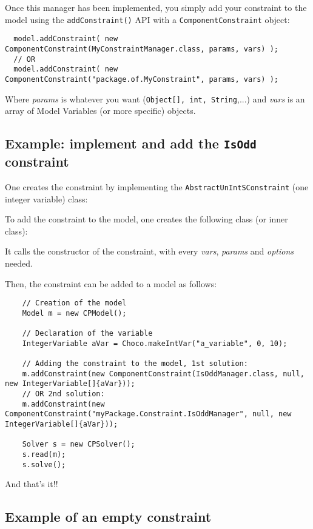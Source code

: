 Once this manager has been implemented, you simply add your constraint to the model using the \texttt{addConstraint()} API with a \texttt{ComponentConstraint} object:
\begin{lstlisting}
  model.addConstraint( new ComponentConstraint(MyConstraintManager.class, params, vars) );
  // OR
  model.addConstraint( new ComponentConstraint("package.of.MyConstraint", params, vars) );
\end{lstlisting}
Where \emph{params} is whatever you want (\texttt{Object[], int, String},...) and \emph{vars} is an array of Model Variables (or more specific) objects.

\subsection{Example: implement and add the \texttt{IsOdd} constraint}
One creates the constraint by implementing the \texttt{AbstractUnIntSConstraint} (one integer variable) class:


To add the constraint to the model, one creates the following class (or inner class):

It calls the constructor of the constraint, with every \emph{vars}, \emph{params} and \emph{options} needed.

Then, the constraint can be added to a model as follows:
\begin{lstlisting}
	// Creation of the model
	Model m = new CPModel();
	
	// Declaration of the variable
	IntegerVariable aVar = Choco.makeIntVar("a_variable", 0, 10);
	
	// Adding the constraint to the model, 1st solution:
	m.addConstraint(new ComponentConstraint(IsOddManager.class, null, new IntegerVariable[]{aVar}));
	// OR 2nd solution:
	m.addConstraint(new ComponentConstraint("myPackage.Constraint.IsOddManager", null, new IntegerVariable[]{aVar}));
	
	Solver s = new CPSolver();
	s.read(m);
	s.solve();
\end{lstlisting}
And that's it!!

\subsection{Example of an empty constraint}\label{advanced:anexempleofemptyconstraint}\hypertarget{advanced:anexempleofemptyconstraint}{}


